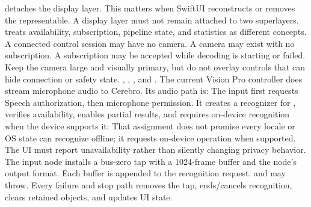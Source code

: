 {} detaches the display layer. This matters when SwiftUI reconstructs or removes the representable. A display layer must not remain attached to two superlayers.\markdownRendererParagraphSeparator
{} treats availability, subscription, pipeline state, and statistics as different concepts. A connected control session may have no camera. A camera may exist with no subscription. A subscription may be accepted while decoding is starting or failed.\markdownRendererParagraphSeparator
{}Keep the camera large and visually primary, but do not overlay controls that can hide connection or safety state.\markdownRendererInterblockSeparator
{}
\markdownRendererSectionEnd \markdownRendererSectionBegin
{}\markdownRendererInterblockSeparator
{}\markdownRendererBlockQuoteBegin
{} , , , and .\markdownRendererBlockQuoteEnd \markdownRendererInterblockSeparator
{}The current Vision Pro controller does  stream microphone audio to Cerebro. Its audio path is:\markdownRendererInterblockSeparator
{}\markdownRendererInterblockSeparator
{}The input first requests Speech authorization, then microphone permission. It creates a recognizer for , verifies availability, enables partial results, and requires on-device recognition when the device supports it:\markdownRendererInterblockSeparator
{}\markdownRendererInterblockSeparator
{}That assignment does not promise every locale or OS state can recognize offline; it requests on-device operation when supported. The UI must report unavailability rather than silently changing privacy behavior.\markdownRendererParagraphSeparator
{}The  input node installs a bus-zero tap with a 1024-frame buffer and the node's output format. Each buffer is appended to the recognition request.  and  may throw. Every failure and stop path removes the tap, ends/cancels recognition, clears retained objects, and updates UI state.\markdownRendererParagraphSeparator
